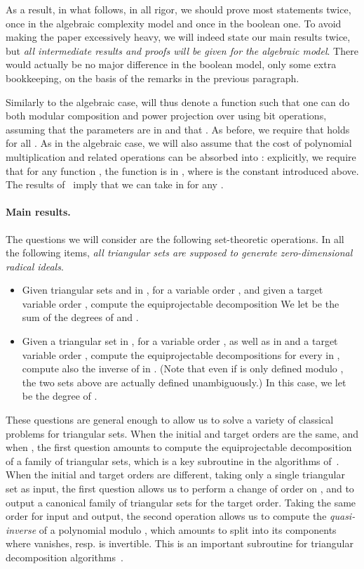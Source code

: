 \documentclass[12pt]{article}
\begin{document}
As a result, in what follows, in all rigor, we should prove most
statements twice, once in the algebraic complexity model and once in
the boolean one. To avoid making the paper excessively heavy, we will
indeed state our main results twice, but {\em all intermediate results
  and proofs will be given for the algebraic model}. There would
actually be no major difference in the boolean model, only some extra
bookkeeping, on the basis of the remarks in the previous paragraph.

Similarly to the algebraic case,  will thus denote a
function such that one can do both modular composition and power
projection over  using  bit
operations, assuming that the parameters  are in
 and that . As before, we require
that  holds for all . As in the algebraic case,
we will also assume that the cost of polynomial multiplication and
related operations can be absorbed into : explicitly,
we require that for any function , the function
 is in , where 
is the constant introduced above. The results of~\cite{PoSc10} imply
that we can take  in
 for any .

\paragraph{Main results.}
The questions we will consider are the following set-theoretic
operations. In all the following items, {\em all triangular sets are
  supposed to generate zero-dimensional radical ideals}.
\begin{itemize}
\item [] Given triangular sets
   and  in
  , for a variable order , and given a target
  variable order , compute the equiprojectable decomposition
   We let
   be the sum of the degrees of
   and .
\item [] Given a triangular set  in
  , for a variable order , as well as  in
   and a target variable order , compute the
  equiprojectable decompositions
   for every  in , compute also the
  inverse of  in . (Note that even if  is only defined
  modulo , the two sets above are actually
  defined unambiguously.)  In this case, we let  be the
  degree of .
\end{itemize}
These questions are general enough to allow us to solve a variety of
classical problems for triangular sets. When the initial and target
orders are the same, and when , the first question amounts to
compute the equiprojectable decomposition of a family of triangular
sets, which is a key subroutine in the algorithms
of~\cite{DaMoScWuXi05}. When the initial and target orders are
different, taking only a single triangular set  as input, the
first question allows us to perform a change of order on , and to
output a canonical family of triangular sets for the target order.
Taking the same order for input and output, the second operation
allows us to compute the {\em quasi-inverse} of a polynomial 
modulo , which amounts to split  into its
components where  vanishes, resp. is invertible.  This is an
important subroutine for triangular decomposition
algorithms~\cite{LiMoPa09}.
\end{document}
